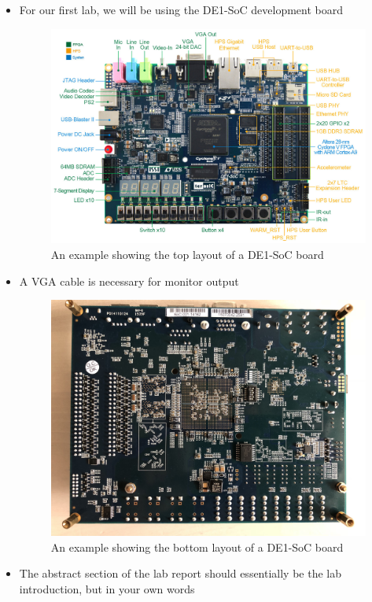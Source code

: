 \begin{itemize}

  \item For our first lab, we will be using the DE1-SoC development board

    \begin{figure}[h!]
      \centering
      \includegraphics[width=.8\textwidth]{Figures/Board.png}
      \caption{An example showing the top layout of a DE1-SoC board}
      \label{fig:1}
    \end{figure}

  \item A VGA cable is necessary for monitor output

    \begin{figure}[h!]
      \centering
      \includegraphics[width=.7\textwidth]{Figures/Board2.png}
      \caption{An example showing the bottom layout of a DE1-SoC board}
      \label{fig:2}
    \end{figure}

  \item The abstract section of the lab report should essentially be the lab introduction, but in your own words


\end{itemize}
